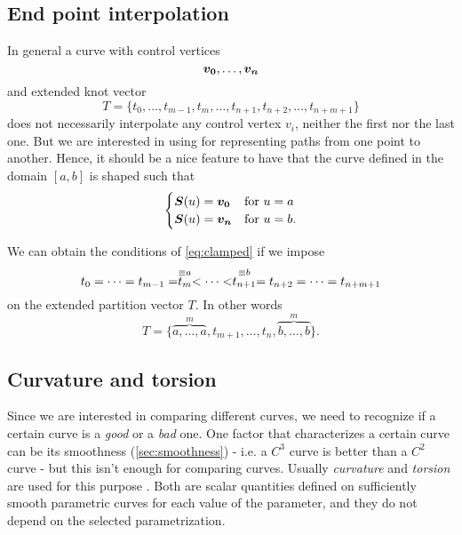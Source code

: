 \documentclass[dissertation.tex]{subfiles}
\begin{document}
\subsection{End point interpolation}\label{sec:clamped}
In general a \bs curve with control vertices
\begin{equation*}
  \boldsymbol{v_0}, \dots, \boldsymbol{v_n}
\end{equation*}
and extended knot vector
\begin{equation*}
  T=\{t_0,\dots,t_{m-1},t_{m},\dots,t_{n+1},t_{n+2},\dots,t_{n+m+1}\}
\end{equation*}
does not necessarily interpolate any control vertex $v_i$, neither the
first nor the last one. But we are
interested in using \bs for representing paths from one point to
another. Hence, it should be a nice feature to have that the curve defined in
the domain $[a,b]$ is shaped such that
\begin{equation}\label{eq:clamped}
  \begin{cases}
    \boldsymbol{S}(u)=\boldsymbol{v_0}& \text{for } u=a\\
    \boldsymbol{S}(u)=\boldsymbol{v_n}& \text{for } u=b.
  \end{cases}
\end{equation}

We can obtain \cite{deboor} the conditions of \cref{eq:clamped} if we
impose
\begin{equation*}
  t_0=\dots= t_{m-1}= \stackrel{\equiv a}{t_{m}}<\dots<
\stackrel{\equiv b}{t_{n+1}}= t_{n+2}=\dots= t_{n+m+1}
\end{equation*}
on the extended partition vector $T$. In other words
\begin{equation*}
  T=\{\overbrace{a,\dots,a}^m,t_{m+1},\dots,t_{n},\overbrace{b,\dots,b}^m\}.
\end{equation*}

\subsection{Curvature and torsion}
Since we are interested in comparing different curves,
we need to recognize if a certain curve is a \emph{good} or a
\emph{bad} one. One factor that characterizes a certain curve can 
be its smoothness (\cref{sec:smoothness}) - i.e. a $C^3$ curve
is better than a $C^2$ curve - but this isn't
enough for comparing curves. Usually
\emph{curvature} and 
\emph{torsion} are used for this purpose
\cite{docarmo}\cite{salomon}. Both are scalar quantities defined on
sufficiently smooth 
parametric curves for each value of the parameter, and they do not
depend on the selected parametrization.
\end{document}
